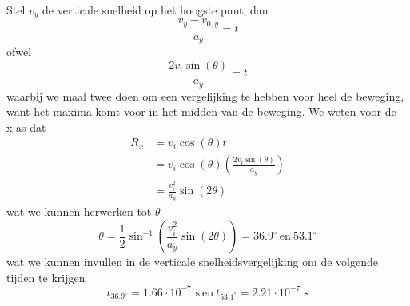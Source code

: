 \begin{description}[labelwidth=1.5cm, leftmargin=!]
        Stel $v_y$ de verticale snelheid op het hoogste punt, dan
        \begin{equation*}
            \frac{v_y-v_{0,y}}{a_y} = t
        \end{equation*}
        ofwel
        \begin{equation*}
            \frac{2v_i\sin(\theta)}{a_y} = t
        \end{equation*}
        waarbij we maal twee doen om een vergelijking te hebben voor heel de beweging, want het maxima komt voor in het midden van de beweging. We weten voor de x-as dat
        \begin{align*}
            R_x 
                &= v_i\cos(\theta)t \\
                &= v_i\cos(\theta)\left( \frac{2v_i\sin(\theta)}{a_y}\right) \\
                &=  \frac{v_i^2}{a_y} \sin(2\theta)
        \end{align*}
        wat we kunnen herwerken tot $\theta$
        \begin{equation*}
            \theta = \frac{1}{2}\sin^{-1}\left(\frac{v_i^2}{a_y} \sin(2\theta)\right) = 36.9^{\circ} \ \text{en} \ 53.1^{\circ} 
        \end{equation*}
        wat we kunnen invullen in de verticale snelheidsvergelijking om de volgende tijden te krijgen
        \begin{equation*}
            t_{36.9^{\circ}} = 1.66 \cdot 10^{-7} \text{ s} \ \text{en} \ t_{53.1^{\circ}} = 2.21 \cdot 10^{-7} \text{ s}
        \end{equation*}
        
    
\end{description}
